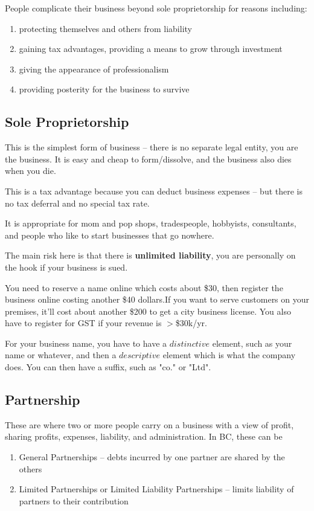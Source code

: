 \documentclass{article}
\begin{document}
People complicate their business beyond sole proprietorship for reasons including:
\begin{enumerate}
\item protecting themselves and others from liability
\item gaining tax advantages, providing a means to grow through investment
\item giving the appearance of professionalism
\item providing posterity for the business to survive 

\end{enumerate}

\subsection{Sole Proprietorship}

This is the simplest form of business -- there is no separate legal entity, you are the business. It is easy and cheap to form/dissolve, and the business also dies when you die. 

This is a tax advantage because you can deduct business expenses -- but there is no tax deferral and no special tax rate.

It is appropriate for mom and pop shops, tradespeople, hobbyists, consultants, and people who like to start businesses that go nowhere. 

The main risk here is that there is \textbf{unlimited liability}, you are personally on the hook if your business is sued.

You need to reserve a name online which costs about \$30, then register the business online costing another \$40 dollars.If you want to serve customers on your premises, it'll cost about another \$200 to get a city business license. You also have to register for GST if your revenue is $>$\$30k/yr.

For your business name, you have to have a $distinctive$ element, such as your name or whatever, and then a $descriptive$ element which is what the company does. You can then have a suffix, such as "co." or "Ltd".

\subsection{Partnership}

These are where two or more people carry on a business with a view of profit, sharing profits, expenses, liability, and administration. In BC, these can be \begin{enumerate}\item General Partnerships -- debts incurred by one partner are shared by the others
\item Limited Partnerships or Limited Liability Partnerships -- limits liability of partners to their contribution
\end{enumerate}
\end{document}
